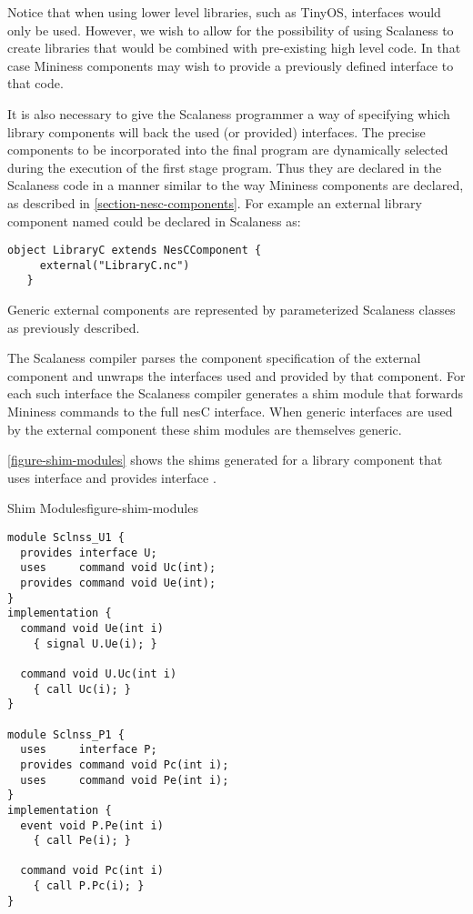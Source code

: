 Notice that when using lower level libraries, such as TinyOS,
interfaces would only be used. However, we wish to allow for the
possibility of using Scalaness to create libraries that would be
combined with pre-existing high level code. In that case Mininess
components may wish to provide a previously defined interface to that
code.

It is also necessary to give the Scalaness programmer a way of
specifying which library components will back the used (or provided)
interfaces. The precise components to be incorporated into the final
program are dynamically selected during the execution of the first
stage program. Thus they are declared in the Scalaness code in a
manner similar to the way Mininess components are declared, as
described in \autoref{section-nesc-components}. For example an
external library component named  could be declared in
Scalaness as: \vspace{1.0ex}
\begin{Verbatim}[fontsize=\small]
   object LibraryC extends NesCComponent {
     external("LibraryC.nc")
   }
\end{Verbatim}
\vspace{1.0ex}

Generic external components are represented by parameterized
Scalaness classes as previously described.

The Scalaness compiler parses the component specification of the
external component and unwraps the interfaces used and provided by
that component. For each such interface the Scalaness compiler
generates a shim module that forwards Mininess commands to the full
nesC interface. When generic interfaces are used by the external
component these shim modules are themselves generic.

\autoref{figure-shim-modules} shows the shims generated for a library
component  that uses interface  and provides
interface .

\begin{fpfig}[tbhp]{Shim Modules}{figure-shim-modules}
{
\begin{Verbatim}[fontsize=\small]
module Sclnss_U1 {
  provides interface U;
  uses     command void Uc(int);
  provides command void Ue(int);
}
implementation {
  command void Ue(int i)
    { signal U.Ue(i); }

  command void U.Uc(int i)
    { call Uc(i); }
}

module Sclnss_P1 {
  uses     interface P;
  provides command void Pc(int i);
  uses     command void Pe(int i);
}
implementation {
  event void P.Pe(int i)
    { call Pe(i); }

  command void Pc(int i)
    { call P.Pc(i); }
}
\end{Verbatim}
}
\end{fpfig}

